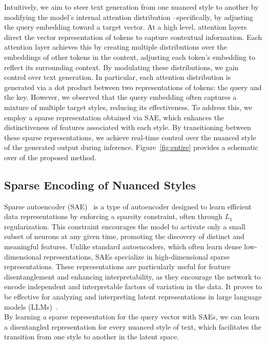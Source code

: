 
Intuitively, we aim to steer text generation from one nuanced style to another by modifying the model’s internal attention distribution --specifically, by adjusting the query embedding toward a target vector.  At a high level, attention layers direct the vector representation of tokens to capture contextual information. Each attention layer achieves this by creating multiple distributions over the embeddings of other tokens in the context, adjusting each token's embedding to reflect its surrounding context. By modulating these distributions, we gain control over text generation. In particular, each attention distribution is generated via a dot product between two representations of tokens: the query and the key. However, we observed that the query embedding often captures a mixture of multiple target styles, reducing its effectiveness. To address this, we employ a sparse representation obtained via SAE, which enhances the distinctiveness of features associated with each style. By transitioning between these sparse representations, we achieve real-time control over the nuanced style of the generated output during inference. Figure~\ref{fig:entire} provides a schematic over of the proposed method.


\subsection{Sparse Encoding of Nuanced Styles}
Sparse autoencoder (SAE)~\cite{konda2014zero,lee2007sparse} is a type of autoencoder designed to learn efficient data representations by enforcing a sparsity constraint, often through $L_1$ regularization. This constraint encourages the model to activate only a small subset of neurons at any given time, promoting the discovery of distinct and meaningful features. Unlike standard autoencoders, which often learn dense low-dimensional representations, SAEs specialize in high-dimensional sparse representations. These representations are particularly useful for feature disentanglement and enhancing interpretability, as they encourage the network to encode independent and interpretable factors of variation in the data. 
It proves to be effective for analyzing and interpreting latent representations in large language models (LLMs)~\cite{cunningham2023sparse,bloom2024open,marks2023some}. \\
By learning a sparse representation for the query vector with SAEs, we can learn a disentangled representation for every nuanced style of text, which facilitates the transition from one style to another in the latent space.

